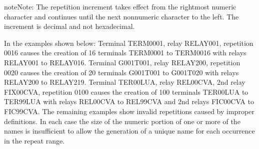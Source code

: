 \documentclass[letterpaper,10pt,english]{sphinxmanual}
\begin{document}
\begin{sphinxadmonition}{note}{Note:}
\sphinxAtStartPar
The repetition increment takes effect from the rightmost numeric character and continues until the next nonnumeric character to the left. The increment is decimal and not hexadecimal.
\end{sphinxadmonition}

\sphinxAtStartPar
{}

\sphinxAtStartPar
In the examples shown below:
\sphinxhyphen{} Terminal TERM0001, relay RELAY001, repetition 0016 causes the creation of 16 terminals TERM0001 to TERM0016 with relays RELAY001 to RELAY016.
\sphinxhyphen{} Terminal G001T001, relay RELAY200, repetition 0020 causes the creation of 20 terminals G001T001 to G001T020 with relays RELAY200 to RELAY219.
\sphinxhyphen{} Terminal TER00LUA, relay REL00CVA, 2nd relay FIX00CVA, repetition 0100 causes the creation of 100 terminals TER00LUA to TER99LUA with relays REL00CVA to REL99CVA and 2nd relays FIC00CVA to FIC99CVA.
\sphinxhyphen{} The remaining examples show invalid repetitions caused by improper definitions. In each case the size of the numeric portion of one or more of the names is insufficient to allow the generation of a unique name for each occurrence in the repeat range.
\end{document}

